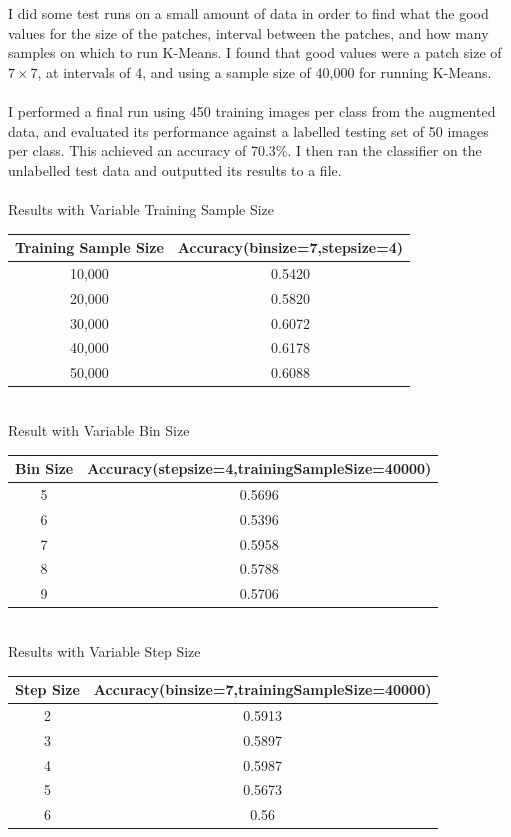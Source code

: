 \documentclass{article}
\begin{document}
	I did some test runs on a small amount of data in order to find what the good values for the size of the patches, interval between the patches, and how many samples on which to run K-Means. I found that good values were a patch size of $7\times7$, at intervals of 4, and using  a sample size of 40,000 for running K-Means. \\
	\\
	I performed a final run using 450 training images per class from the augmented data, and evaluated its performance against a labelled testing set of 50 images per class. This achieved an accuracy of 70.3\%. I then ran the classifier on the unlabelled test data and outputted its results to a file.\\
	\\Results with Variable Training Sample Size\\
	\begin{tabular}{|c|c|}
		\hline
		Training Sample Size & Accuracy(binsize=7,stepsize=4)\\ \hline \hline
		10,000 & 0.5420 \\
		20,000 & 0.5820 \\
		30,000 & 0.6072 \\
		40,000 & 0.6178 \\
		50,000 & 0.6088 \\ \hline
	\end{tabular}\\
	Result with Variable Bin Size\\
	\begin{tabular}{|c|c|}
		\hline
		Bin Size & Accuracy(stepsize=4,trainingSampleSize=40000)\\ \hline \hline
		5 & 0.5696 \\
		6 & 0.5396 \\
		7 & 0.5958 \\
		8 & 0.5788 \\
		9 & 0.5706 \\ \hline
	\end{tabular}\\
	Results with Variable Step Size\\
	\begin{tabular}{|c|c|}
		\hline
		Step Size & Accuracy(binsize=7,trainingSampleSize=40000)\\ \hline \hline
		2 & 0.5913 \\
		3 & 0.5897 \\
		4 & 0.5987 \\
		5 & 0.5673 \\
		6 & 0.56 \\ \hline
	\end{tabular}
	
\end{document}
